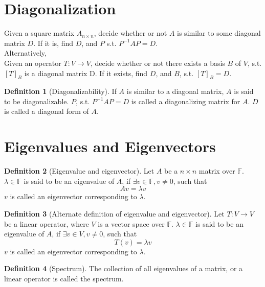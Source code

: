 \documentclass[fleqn, a4paper, 12pt, draft]{article}
\theoremstyle{definition}
\newtheorem{definition}{Definition} %
\theoremstyle{theorem}
\theoremstyle{remark}
\numberwithin{corollary}{theorem}
\numberwithin{equation}{theorem}
\begin{document}
\section{Diagonalization}

Given a square matrix $A_{n \times n}$, decide whether or not $A$ is similar to some diagonal matrix $D$. If it is, find $D$, and $P$ s.t. $P^{-1} A P = D$.\\
Alternatively,\\
Given an operator $T : V \to V$, decide whether or not there exists a basis $B$ of $V$, s.t. $[T]_B$ is a diagonal matrix D. If it exists, find $D$, and $B$, s.t. $[T]_B = D$.

\begin{definition}[Diagonalizability]
	If $A$ is similar to a diagonal matrix, $A$ is said to be diagonalizable. $P$, s.t. $P^{-1} A P = D$ is called a diagonalizing matrix for $A$. $D$ is called a diagonal form of $A$.
\end{definition}

\section{Eigenvalues and Eigenvectors}

\begin{definition}[Eigenvalue and eigenvector]
	Let $A$ be a $n \times n$ matrix over $\mathbb{F}$. $\lambda \in \mathbb{F}$ is said to be an eigenvalue of $A$, if $\exists v \in \mathbb{F}, v\neq 0$, such that
	\begin{equation*}
		A v = \lambda v
	\end{equation*}
	$v$ is called an eigenvector corresponding to $\lambda$.
\end{definition}

\begin{definition}[Alternate definition of eigenvalue and eigenvector]
	Let $T : V \to V$ be a linear operator, where $V$ is a vector space over $\mathbb{F}$. $\lambda \in \mathbb{F}$ is said to be an eigenvalue of $A$, if $\exists v \in V, v\neq 0$, such that
	\begin{equation*}
		T(v) = \lambda v
	\end{equation*}
	$v$ is called an eigenvector corresponding to $\lambda$.
\end{definition}

\begin{definition}[Spectrum]
	The collection of all eigenvalues of a matrix, or a linear operator is called the spectrum.
\end{definition}
\end{document}

